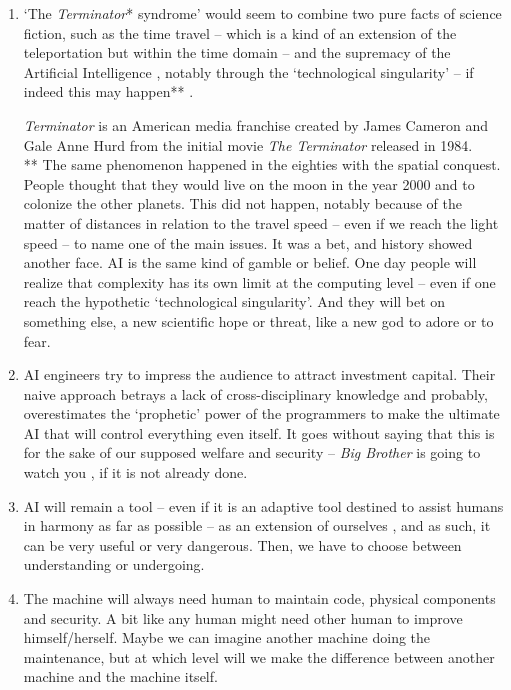 \documentclass{article}
\begin{document}
\begin{enumerate}[leftmargin=*,label=\underline{\textit{Statement} \arabic*} :]
\itemsep0.9em 
\item `The \textit{Terminator}*
syndrome' would seem to combine two pure facts of science fiction, such as the time travel -- which is a kind of an extension of the teleportation but within the time domain -- and the supremacy of the Artificial Intelligence%
, notably through the `technological singularity' 
-- if indeed this may happen**
 \citep{dam}. 
\begin{spacing}{0.8}
{\footnotesize * \textit{Terminator} is an American media franchise created by James Cameron and Gale Anne Hurd from the initial movie \textit{The Terminator} released in 1984. \\ ** The same phenomenon happened in the eighties with the spatial conquest. People thought that they would live on the moon in the year 2000 and to colonize the other planets. This did not happen, notably because of the matter of distances in relation to the travel speed -- even if we reach the light speed -- to name one of the main issues. It was a bet, and history showed another face. 
AI is the same kind of gamble or belief. One day people will realize that complexity has its own limit at the computing level --  even if one reach the hypothetic `technological singularity'. And they will bet on something else, a new scientific hope or threat, like a new god to adore or to fear. 
}%
\end{spacing}
\vspace{1mm}
\item AI engineers try to impress the audience to attract investment capital. 
Their naive approach betrays a lack of cross-disciplinary knowledge and probably, 
overestimates the `prophetic' power of the programmers to make the ultimate AI that will control everything even itself. It goes without saying that this is for the sake of our supposed welfare and security -- \textit{Big Brother} is going to watch you \citep{bbgo}, if it is not already done.
\item AI will remain a tool  -- even if it is an adaptive tool destined to assist humans in harmony as far as possible  -- as an extension of ourselves \citep{mm}, and as such, it can be very useful or very dangerous. Then, we have to choose between understanding or undergoing.
\item The machine will always need human to maintain code, physical components and security. A bit like any human might need other human to improve himself/herself. Maybe we can imagine another machine doing the maintenance, but at which level will we make the difference between another machine and the machine itself.

\end{enumerate}
\end{document}
